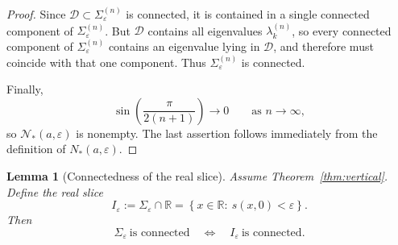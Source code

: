 \documentclass[11pt]{article}
\numberwithin{equation}{section}
\newtheorem{lemma}[theorem]{Lemma}
\begin{document}
\begin{proof}
Since \(\mathcal D\subset\Sigma_\varepsilon^{(n)}\) is connected, it is contained in a single
connected component of \(\Sigma_\varepsilon^{(n)}\).  But \(\mathcal D\) contains all
eigenvalues \(\lambda_k^{(n)}\), so every connected component of
\(\Sigma_\varepsilon^{(n)}\) contains an eigenvalue lying in \(\mathcal D\), and therefore
must coincide with that one component.  Thus \(\Sigma_\varepsilon^{(n)}\) is connected.

Finally,
\[
\sin\!\left(\frac{\pi}{2(n+1)}\right)\longrightarrow0
\qquad\text{as }n\to\infty,
\]
so \(\mathcal N_*(a,\varepsilon)\) is nonempty.  The last assertion follows immediately
from the definition of \(N_*(a,\varepsilon)\).
\end{proof}

\begin{lemma}[Connectedness of the real slice]\label{lem:real-slice-connected}
Assume Theorem~\ref{thm:vertical}.  Define the real slice
\[
I_\varepsilon
:=
\Sigma_\varepsilon\cap\mathbb R
=
\left\{
x\in\mathbb R:\ s(x,0)<\varepsilon
\right\}.
\]
Then
\[
\Sigma_\varepsilon\ \text{is connected}
\quad\Longleftrightarrow\quad
I_\varepsilon\ \text{is connected}.
\]
\end{lemma}
\end{document}
